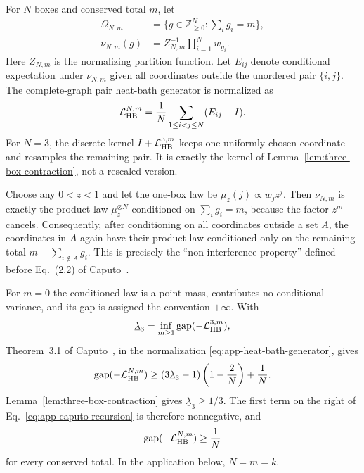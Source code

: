 For $N$ boxes and conserved total $m$, let
\begin{align}
 \Omega_{N,m}
 &=\{g\in\mathbb Z_{\geq0}^{N}:\textstyle\sum_i g_i=m\},\\
 \nu_{N,m}(g)&=Z_{N,m}^{-1}\prod_{i=1}^{N}w_{g_i}.
\end{align}
Here $Z_{N,m}$ is the normalizing partition function.
Let $E_{ij}$ denote conditional expectation under $\nu_{N,m}$ given all
coordinates outside the unordered pair $\{i,j\}$.  The complete-graph
pair heat-bath generator is normalized as
\begin{equation}
 \mathcal L_{\rm HB}^{N,m}
 =\frac1N\sum_{1\leq i<j\leq N}(E_{ij}-I).
 \label{eq:app-heat-bath-generator}
\end{equation}
For $N=3$, the discrete kernel $I+\mathcal L_{\rm HB}^{3,m}$ keeps one
uniformly chosen coordinate and resamples the remaining pair.  It is exactly
the kernel of Lemma~\ref{lem:three-box-contraction}, not a rescaled version.

Choose any $0<z<1$ and let the one-box law be
$\mu_z(j)\propto w_jz^j$.  Then $\nu_{N,m}$ is exactly the product law
$\mu_z^{\otimes N}$ conditioned on $\sum_i g_i=m$, because the factor
$z^m$ cancels.  Consequently, after conditioning on all coordinates outside
a set $A$, the coordinates in $A$ again have their product law conditioned
only on the remaining total $m-\sum_{i\notin A}g_i$.  This is precisely the
``non-interference property'' defined before Eq.~(2.2) of
Caputo~\cite{Caputo2008}.

For $m=0$ the conditioned law is
a point mass, contributes no conditional variance, and its gap is assigned
the convention $+\infty$.  With
\begin{equation}
 \underline\lambda_3
 =\inf_{m\geq1}\operatorname{gap}
 (-\mathcal L_{\rm HB}^{3,m}),
\end{equation}
Theorem~3.1 of Caputo~\cite{Caputo2008}, in the normalization
\eqref{eq:app-heat-bath-generator}, gives
\begin{equation}
 \operatorname{gap}(-\mathcal L_{\rm HB}^{N,m})
 \geq(3\underline\lambda_3-1)
 \left(1-\frac2N\right)+\frac1N.
 \label{eq:app-caputo-recursion}
\end{equation}
Lemma~\ref{lem:three-box-contraction} gives
$\underline\lambda_3\geq1/3$.  The first term on the right of
Eq.~\eqref{eq:app-caputo-recursion} is therefore nonnegative, and
\begin{equation}
 \operatorname{gap}(-\mathcal L_{\rm HB}^{N,m})\geq\frac1N
 \label{eq:app-heat-bath-gap}
\end{equation}
for every conserved total.  In the application below, $N=m=k$.


